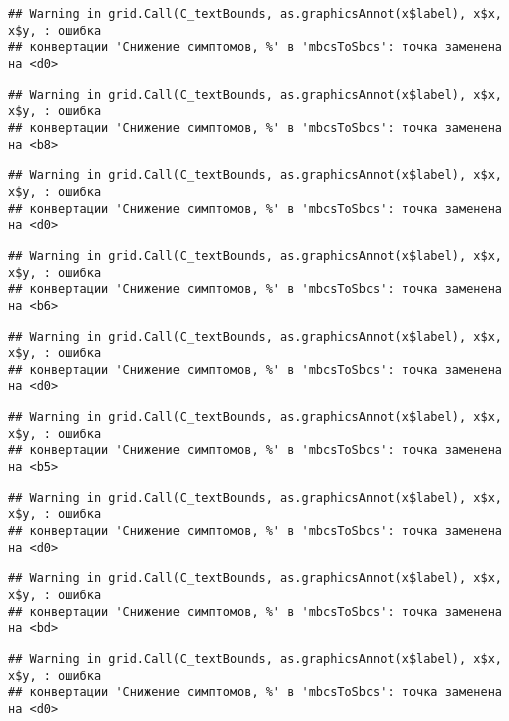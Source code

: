 \documentclass[
]{article}
\begin{document}
\begin{verbatim}
## Warning in grid.Call(C_textBounds, as.graphicsAnnot(x$label), x$x, x$y, : ошибка
## конвертации 'Снижение симптомов, %' в 'mbcsToSbcs': точка заменена на <d0>
\end{verbatim}

\begin{verbatim}
## Warning in grid.Call(C_textBounds, as.graphicsAnnot(x$label), x$x, x$y, : ошибка
## конвертации 'Снижение симптомов, %' в 'mbcsToSbcs': точка заменена на <b8>
\end{verbatim}

\begin{verbatim}
## Warning in grid.Call(C_textBounds, as.graphicsAnnot(x$label), x$x, x$y, : ошибка
## конвертации 'Снижение симптомов, %' в 'mbcsToSbcs': точка заменена на <d0>
\end{verbatim}

\begin{verbatim}
## Warning in grid.Call(C_textBounds, as.graphicsAnnot(x$label), x$x, x$y, : ошибка
## конвертации 'Снижение симптомов, %' в 'mbcsToSbcs': точка заменена на <b6>
\end{verbatim}

\begin{verbatim}
## Warning in grid.Call(C_textBounds, as.graphicsAnnot(x$label), x$x, x$y, : ошибка
## конвертации 'Снижение симптомов, %' в 'mbcsToSbcs': точка заменена на <d0>
\end{verbatim}

\begin{verbatim}
## Warning in grid.Call(C_textBounds, as.graphicsAnnot(x$label), x$x, x$y, : ошибка
## конвертации 'Снижение симптомов, %' в 'mbcsToSbcs': точка заменена на <b5>
\end{verbatim}

\begin{verbatim}
## Warning in grid.Call(C_textBounds, as.graphicsAnnot(x$label), x$x, x$y, : ошибка
## конвертации 'Снижение симптомов, %' в 'mbcsToSbcs': точка заменена на <d0>
\end{verbatim}

\begin{verbatim}
## Warning in grid.Call(C_textBounds, as.graphicsAnnot(x$label), x$x, x$y, : ошибка
## конвертации 'Снижение симптомов, %' в 'mbcsToSbcs': точка заменена на <bd>
\end{verbatim}

\begin{verbatim}
## Warning in grid.Call(C_textBounds, as.graphicsAnnot(x$label), x$x, x$y, : ошибка
## конвертации 'Снижение симптомов, %' в 'mbcsToSbcs': точка заменена на <d0>
\end{verbatim}
\end{document}
